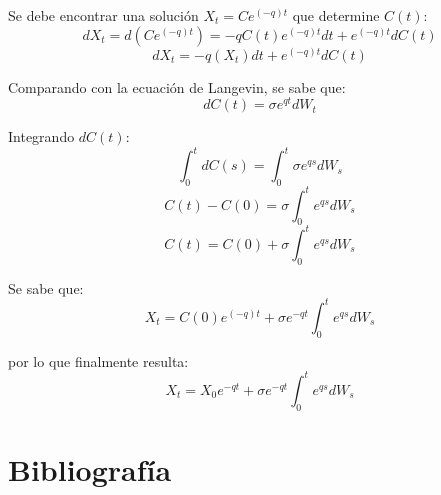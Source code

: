 \documentclass[11pt,fleqn]{book} %
\numberwithin{equation}{section} %
\numberwithin{figure}{section} %
\numberwithin{table}{section} %
\begin{document}
Se debe encontrar una solución $  X_{t} = Ce^{(-q)t} $ que determine $C(t)$:
$$ dX_{t} = d(Ce^{(-q)t}) = -qC(t)e^{(-q)t} dt + e^{(-q)t} dC(t) $$
$$ dX_{t} = -q(X_{t}) dt + e^{(-q)t} dC(t) $$

Comparando con la ecuación de Langevin, se sabe que:
$$ dC(t) = \sigma e^{qt}dW_{t} $$

Integrando $dC(t)$:
$$ \int_{0}^{t} dC(s) =  \int_{0}^{t} \sigma e^{qs}dW_{s} $$ 
$$ C(t) - C(0) =  \sigma \int_{0}^{t} e^{qs}dW_{s} $$
$$ C(t) = C(0) + \sigma \int_{0}^{t} e^{qs}dW_{s} $$

Se sabe que:
$$ X_{t} = C(0)e^{(-q)t} + \sigma e^{-qt} \int_{0}^{t} e^{qs}dW_{s}  $$

por lo que finalmente resulta:
$$ X_{t} = X_{0}e^{-qt}+\sigma e^{-qt} \int_{0}^{t}e^{qs}dW_{s}  $$
\chapter{Bibliografía}


\printbibliography[heading=bibempty,type=book]
\end{document}
